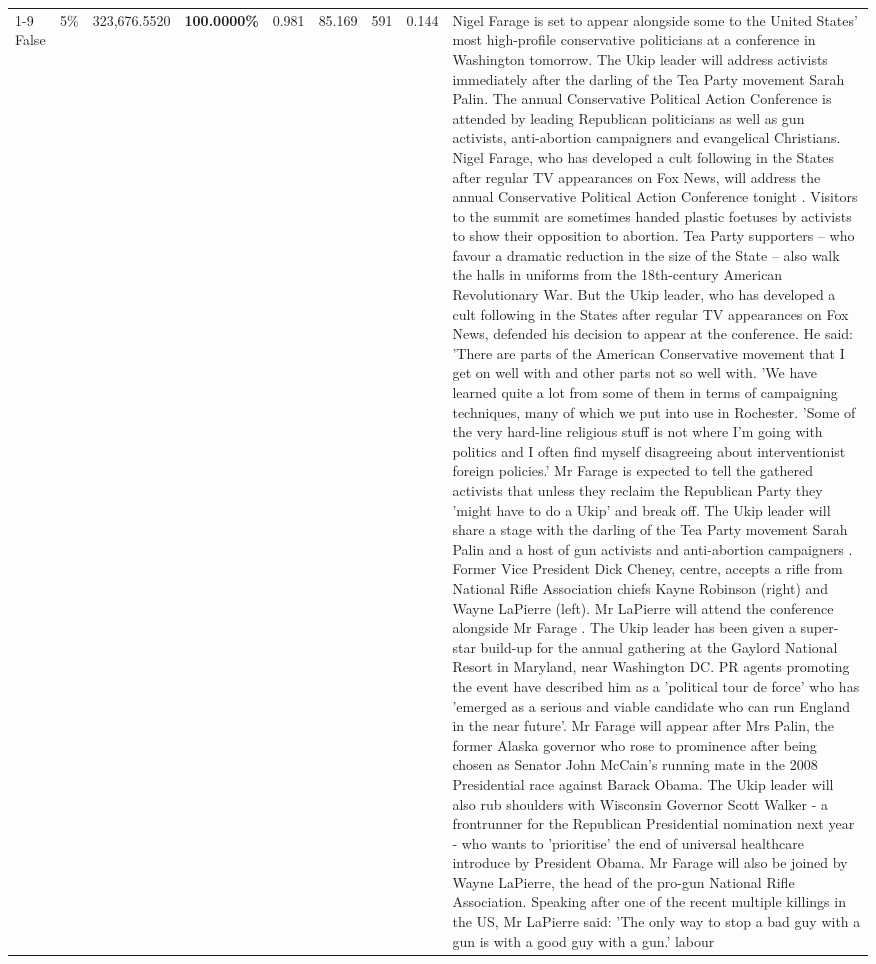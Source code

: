 \begin{table}[H]
\begin{tabular}{lllrlllll}
\cline{1-9} \cline{2-9}
False & 5\% & 323,676.5520 & \bfseries \color{red} 100.0000\% & 0.981 & 85.169 & 591 & 0.144 & Nigel Farage is set to appear alongside some to the United States' most high-profile conservative politicians at a conference in Washington tomorrow. The Ukip leader will address activists immediately after the darling of the Tea Party movement Sarah Palin. The annual Conservative Political Action Conference is attended by leading Republican politicians as well as gun activists, anti-abortion campaigners and evangelical Christians. Nigel Farage, who has developed a cult following in the States after regular TV appearances on Fox News, will address the annual Conservative Political Action Conference tonight . Visitors to the summit are sometimes handed plastic foetuses by activists to show their opposition to abortion. Tea Party supporters – who favour a dramatic reduction in the size of the State – also walk the halls in uniforms from the 18th-century American Revolutionary War. But the Ukip leader, who has developed a cult following in the States after regular TV appearances on Fox News, defended his decision to appear at the conference. He said: 'There are parts of the American Conservative movement that I get on well with and other parts not so well with. 'We have learned quite a lot from some of them in terms of campaigning techniques, many of which we put into use in Rochester. 'Some of the very hard-line religious stuff is not where I'm going with politics and I often find myself disagreeing about interventionist foreign policies.' Mr Farage is expected to tell the gathered activists that unless they reclaim the Republican Party they 'might have to do a Ukip' and break off. The Ukip leader will share a stage with the darling of the Tea Party movement Sarah Palin and a host of gun activists and anti-abortion campaigners . Former Vice President Dick Cheney, centre, accepts a rifle from National Rifle Association chiefs Kayne Robinson (right) and Wayne LaPierre (left). Mr LaPierre will attend the conference alongside Mr Farage . The Ukip leader has been given a super-star build-up for the annual gathering at the Gaylord National Resort in Maryland, near Washington DC. PR agents promoting the event have described him as a 'political tour de force' who has 'emerged as a serious and viable candidate who can run England in the near future'. Mr Farage will appear after Mrs Palin, the former Alaska governor who rose to prominence after being chosen as Senator John McCain's running mate in the 2008 Presidential race against Barack Obama. The Ukip leader will also rub shoulders with Wisconsin Governor Scott Walker - a frontrunner for the Republican Presidential nomination next year - who wants to 'prioritise' the end of universal healthcare introduce by President Obama. Mr Farage will also be joined by Wayne LaPierre, the head of the pro-gun National Rifle Association. Speaking after one of the recent multiple killings in the US, Mr LaPierre said: 'The only way to stop a bad guy with a gun is with a good guy with a gun.' labour \\

\end{tabular}
\end{table}
